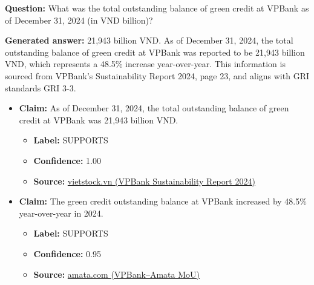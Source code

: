 \documentclass[sn-mathphys, oneside]{sn-jnl}
\begin{document}
\begin{tcolorbox}[colback=white,colframe=black!65,boxrule=0.6pt,arc=0pt,left=8pt,right=8pt,top=8pt,bottom=8pt]

\textbf{Question:} What was the total outstanding balance of green credit at VPBank as of December 31, 2024 (in VND billion)?

\textbf{Generated answer:} 21,943 billion VND. As of December 31, 2024, the total outstanding balance of green credit at VPBank was reported to be 21,943 billion VND, which represents a 48.5\% increase year-over-year. This information is sourced from VPBank's Sustainability Report 2024, page 23, and aligns with GRI standards GRI 3-3.

\begin{itemize}
    \item \textbf{Claim:} As of December 31, 2024, the total outstanding balance of green credit at VPBank was 21,943 billion VND.
    \begin{itemize}
        \item \textbf{Label:} SUPPORTS
        \item \textbf{Confidence:} 1.00
        \item \textbf{Source:} \href{https://static2.vietstock.vn/vietstock/2025/7/3/20250702___vpb___sustainability_report_2024.pdf}{vietstock.vn (VPBank Sustainability Report 2024)}
    \end{itemize}

    \item \textbf{Claim:} The green credit outstanding balance at VPBank increased by 48.5\% year-over-year in 2024.
    \begin{itemize}
        \item \textbf{Label:} SUPPORTS
        \item \textbf{Confidence:} 0.95
        \item \textbf{Source:} \href{https://amata.com/news-media-vietnam/93-articles-vietnam/1357-memorandum-of-understanding-between-amata-city-ha-long-and-vpbank}{amata.com (VPBank–Amata MoU)}
    \end{itemize}
\end{itemize}

\end{tcolorbox}
\end{document}
